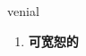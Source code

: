 
\begin{frame}
{\huge venial}
\begin{center}
\begin{enumerate}\Large
  \item \textbf{可宽恕的}
\end{enumerate}
\end{center}
\end{frame}
